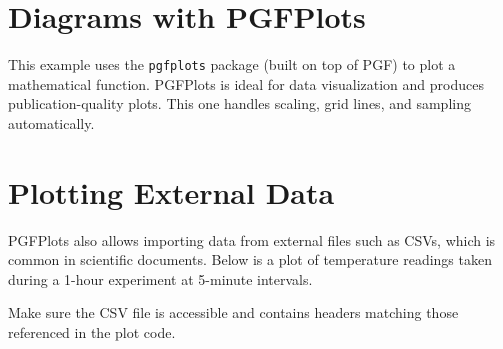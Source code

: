 \section{Diagrams with PGFPlots}

This example uses the \texttt{pgfplots} package (built on top of PGF) to plot a mathematical function. PGFPlots is ideal for data visualization and produces publication-quality plots. This one handles scaling, grid lines, and sampling automatically.


\section{Plotting External Data}

PGFPlots also allows importing data from external files such as CSVs, which is common in scientific documents. Below is a plot of temperature readings taken during a 1-hour experiment at 5-minute intervals.

Make sure the CSV file is accessible and contains headers matching those referenced in the plot code.





